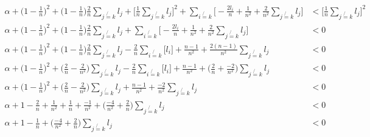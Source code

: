 {\begin{align*}
\alpha
+
\Big(1 - \frac{1}{n}\Big)^2 + \Big(1 - \frac{1}{n}\Big)\frac{2}{n} \sum_{j\not{=}k} l_j + \Big[\frac{1}{n} \sum_{j\not{=}k} l_j\Big]^2
+
\sum_{i\not{=}k} \Big[ - \frac{2l_i}{n} + \frac{1}{n^2} +  \frac{2}{n^2}\sum_{j\not{=}k} l_j  \Big]
&<
\Big[\frac{1}{n} \sum_{j\not{=}k} l_j\Big]^2
\\
\alpha
+
\Big(1 - \frac{1}{n}\Big)^2 + \Big(1 - \frac{1}{n}\Big)\frac{2}{n} \sum_{j\not{=}k} l_j
+
\sum_{i\not{=}k} \Big[ - \frac{2l_i}{n} + \frac{1}{n^2} +  \frac{2}{n^2}\sum_{j\not{=}k} l_j  \Big]
&<
0
\\
\alpha
+
\Big(1 - \frac{1}{n}\Big)^2 + \Big(1 - \frac{1}{n}\Big)\frac{2}{n} \sum_{j\not{=}k} l_j
-
\frac{2}{n} \sum_{i\not{=}k} \Big[ l_i \Big]
+ \frac{n-1}{n^2} +  \frac{2(n-1)}{n^2}\sum_{j\not{=}k} l_j
&<
0
\\
\alpha
+
\Big(1 - \frac{1}{n}\Big)^2 + \Big(\frac{2}{n} - \frac{2}{n^2}\Big) \sum_{j\not{=}k} l_j
-
\frac{2}{n} \sum_{i\not{=}k} \Big[ l_i \Big]
+ \frac{n-1}{n^2}
+  \Big(\frac{2}{n} + \frac{-2}{n^2} \Big)
\sum_{j\not{=}k} l_j
&<
0
\\
\alpha
+
\Big(1 - \frac{1}{n}\Big)^2 + \Big(\frac{2}{n} - \frac{2}{n^2}\Big) \sum_{j\not{=}k} l_j
+ \frac{n-1}{n^2}
+ \frac{-2}{n^2}
\sum_{j\not{=}k} l_j
&<
0
\\
\alpha
+
1 - \frac{2}{n} + \frac{1}{n^2}
+ \frac{1}{n}
+ \frac{-1}{n^2}
+
\Big(
\frac{-4}{n^2}
+
\frac{2}{n}
\Big)
\sum_{j\not{=}k} l_j
&<
0
\\
\alpha
+
1
- \frac{1}{n}
+
\Big(
\frac{-4}{n^2}
+
\frac{2}{n}
\Big)
\sum_{j\not{=}k} l_j
&<
0
\\
\end{align*}
}

